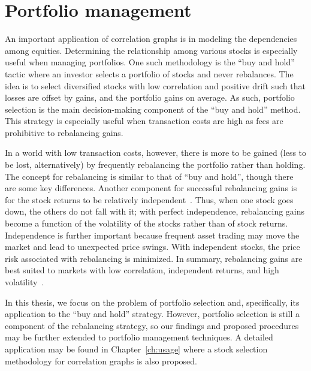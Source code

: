 \section{Portfolio management}
\label{sec:intro:finance}

An important application of correlation graphs is in modeling the dependencies 
among equities. Determining the relationship among various stocks is 
especially useful when managing portfolios. One such methodology is the ``buy 
and hold'' tactic where an investor selects a portfolio of stocks and never 
rebalances. The idea is to select diversified stocks with low correlation and 
positive drift such that losses are offset by gains, and the portfolio gains on 
average. As such, portfolio selection is the main decision-making component of 
the ``buy and hold'' method. This strategy is especially useful when 
transaction costs are high as fees are prohibitive to rebalancing gains. 

In a world with low transaction costs, however, there is more to be gained 
(less to be lost, alternatively) by frequently rebalancing the portfolio rather 
than holding. The concept for rebalancing is similar to that of ``buy and 
hold'', though there are some key differences. Another component for successful 
rebalancing gains is for the stock returns to be relatively 
independent~\cite{liuh2016}. Thus, when one stock goes down, the others do not 
fall with it; with perfect independence, rebalancing gains become a function of 
the volatility of the stocks rather than of stock returns. Independence is 
further important because frequent asset trading may move the market and lead 
to unexpected price swings. With independent stocks, the price risk associated 
with rebalancing is minimized. In summary, rebalancing gains are best suited to 
markets with low correlation, independent returns, and high 
volatility~\cite{liuh2016}. 

In this thesis, we focus on the problem of portfolio selection and, 
specifically, its application to the ``buy and hold'' strategy. However, 
portfolio selection is still a component of the rebalancing strategy, so our 
findings and proposed procedures may be further extended to portfolio 
management techniques.
A detailed application may be found in Chapter~\ref{ch:usage} where
a stock selection methodology for correlation graphs is also proposed.

